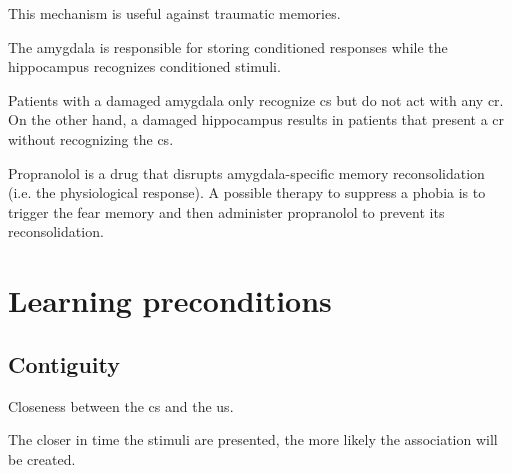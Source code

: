 \begin{remark}
    This mechanism is useful against traumatic memories.
\end{remark}

\begin{remark}
    The amygdala is responsible for storing conditioned responses while the hippocampus recognizes conditioned stimuli.

    Patients with a damaged amygdala only recognize \ac{cs} but do not act with any \ac{cr}.
    On the other hand, a damaged hippocampus results in patients that present a \ac{cr} without recognizing the \ac{cs}.
\end{remark}

\begin{casestudy}
    Propranolol is a drug that disrupts amygdala-specific memory reconsolidation (i.e. the physiological response).
    A possible therapy to suppress a phobia is to trigger the fear memory and then administer propranolol to prevent its reconsolidation.
\end{casestudy}



\section{Learning preconditions}

\subsection{Contiguity}

Closeness between the \acl{cs} and the \acl{us}.

\begin{remark}
    The closer in time the stimuli are presented, the more likely the association will be created.
\end{remark}


